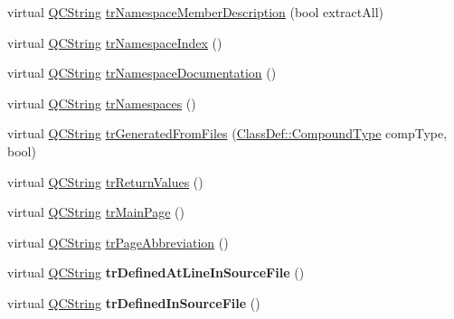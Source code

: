 \begin{DoxyCompactItemize}
\item 
virtual \mbox{\hyperlink{class_q_c_string}{Q\+C\+String}} \mbox{\hyperlink{class_translator_vietnamese_a71a47f387300d05b036d5e5cc134d22c}{tr\+Namespace\+Member\+Description}} (bool extract\+All)
\item 
virtual \mbox{\hyperlink{class_q_c_string}{Q\+C\+String}} \mbox{\hyperlink{class_translator_vietnamese_a7b759ab94f0ce9635c12e7800866c29c}{tr\+Namespace\+Index}} ()
\item 
virtual \mbox{\hyperlink{class_q_c_string}{Q\+C\+String}} \mbox{\hyperlink{class_translator_vietnamese_a5a2c9d549ce8daed5c3cdd0275c2e1fc}{tr\+Namespace\+Documentation}} ()
\item 
virtual \mbox{\hyperlink{class_q_c_string}{Q\+C\+String}} \mbox{\hyperlink{class_translator_vietnamese_a743f432bb5d4adef074bae10d3c0cda2}{tr\+Namespaces}} ()
\item 
virtual \mbox{\hyperlink{class_q_c_string}{Q\+C\+String}} \mbox{\hyperlink{class_translator_vietnamese_a410ae6f502f7025da6648e3f384e84bd}{tr\+Generated\+From\+Files}} (\mbox{\hyperlink{class_class_def_ae70cf86d35fe954a94c566fbcfc87939}{Class\+Def\+::\+Compound\+Type}} comp\+Type, bool)
\item 
virtual \mbox{\hyperlink{class_q_c_string}{Q\+C\+String}} \mbox{\hyperlink{class_translator_vietnamese_aa356fe633dabe2485060a0ff7a8f0190}{tr\+Return\+Values}} ()
\item 
virtual \mbox{\hyperlink{class_q_c_string}{Q\+C\+String}} \mbox{\hyperlink{class_translator_vietnamese_ad11c072a404e5ecfebd28e02dc662621}{tr\+Main\+Page}} ()
\item 
virtual \mbox{\hyperlink{class_q_c_string}{Q\+C\+String}} \mbox{\hyperlink{class_translator_vietnamese_afc76d699c489e9be24dc1427236bff02}{tr\+Page\+Abbreviation}} ()
\item 
\mbox{\label{class_translator_vietnamese_ac6d4cf6269a7989caf25aa25d1526882}} 
virtual \mbox{\hyperlink{class_q_c_string}{Q\+C\+String}} {\bfseries tr\+Defined\+At\+Line\+In\+Source\+File} ()
\item 
\mbox{\label{class_translator_vietnamese_af3b507a93a4d73f88333c054b6670595}} 
virtual \mbox{\hyperlink{class_q_c_string}{Q\+C\+String}} {\bfseries tr\+Defined\+In\+Source\+File} ()
\item 
\mbox{\label{class_translator_vietnamese_acb5897420e31256a19b1de52196e83e9}} 

\end{DoxyCompactItemize}
